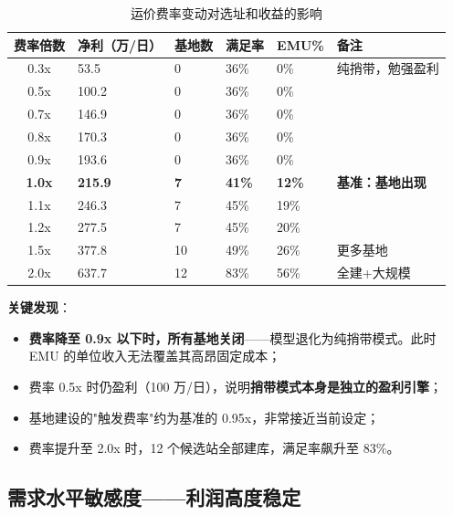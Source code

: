 \documentclass[12pt,a4paper,fontset=none]{ctexart}
\begin{document}
\begin{table}[H]
\centering\small
\caption{运价费率变动对选址和收益的影响}
\begin{tabular}{cC{2cm}C{2.2cm}C{2cm}C{1.8cm}C{1.8cm}}
\toprule
费率倍数 & 净利（万/日） & 基地数 & 满足率 & EMU\% & 备注 \\
\midrule
0.3x & 53.5 & 0 & 36\% & 0\% & 纯捎带，勉强盈利 \\
0.5x & 100.2 & 0 & 36\% & 0\% & \\
0.7x & 146.9 & 0 & 36\% & 0\% & \\
0.8x & 170.3 & 0 & 36\% & 0\% & \\
0.9x & 193.6 & 0 & 36\% & 0\% & \\
\midrule
{}
\textbf{1.0x} & \textbf{215.9} & \textbf{7} & \textbf{41\%} & \textbf{12\%} & \textbf{基准：基地出现} \\
\midrule
1.1x & 246.3 & 7 & 45\% & 19\% & \\
1.2x & 277.5 & 7 & 45\% & 20\% & \\
1.5x & 377.8 & 10 & 49\% & 26\% & 更多基地 \\
2.0x & 637.7 & 12 & 83\% & 56\% & 全建+大规模 \\
\bottomrule
\end{tabular}
\end{table}

\textbf{关键发现}：
\begin{itemize}
    \item \textbf{费率降至 0.9x 以下时，所有基地关闭}——模型退化为纯捎带模式。此时 EMU 的单位收入无法覆盖其高昂固定成本；
    \item 费率 0.5x 时仍盈利（100 万/日），说明\textbf{捎带模式本身是独立的盈利引擎}；
    \item 基地建设的"触发费率"约为基准的 0.95x，非常接近当前设定；
    \item 费率提升至 2.0x 时，12 个候选站全部建库，满足率飙升至 83\%。
\end{itemize}

\subsection{需求水平敏感度——利润高度稳定}
\end{document}
